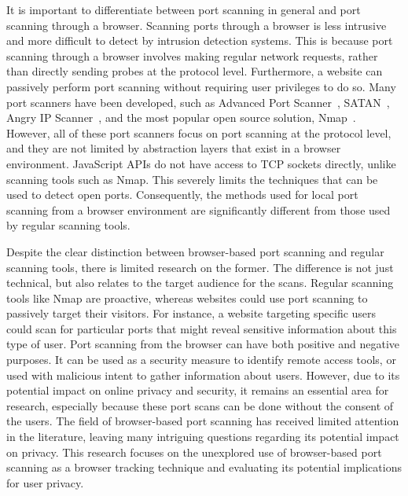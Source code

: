 It is important to differentiate between port scanning in general and port scanning through a browser. 
Scanning ports through a browser is less intrusive and more difficult to detect by intrusion detection systems. This is because port scanning through a browser involves making regular network requests, rather than directly sending probes at the protocol level. Furthermore, a website can passively perform port scanning without requiring user privileges to do so.
Many port scanners have been developed, such as Advanced Port Scanner~, SATAN~, Angry IP Scanner~, and the most popular open source solution, Nmap~. However, all of these port scanners focus on port scanning at the protocol level, and they are not limited by abstraction layers that exist in a browser environment. JavaScript APIs do not have access to TCP sockets directly, unlike scanning tools such as Nmap. This severely limits the techniques that can be used to detect open ports. Consequently, the methods used for local port scanning from a browser environment are significantly different from those used by regular scanning tools.

Despite the clear distinction between browser-based port scanning and regular scanning tools, there is limited research on the former. The difference is not just technical, but also relates to the target audience for the scans. Regular scanning tools like Nmap are proactive, whereas websites could use port scanning to passively target their visitors. For instance, a website targeting specific users could scan for particular ports that might reveal sensitive information about this type of user.
Port scanning from the browser can have both positive and negative purposes. It can be used as a security measure to identify remote access tools, or used with malicious intent to gather information about users. However, due to its potential impact on online privacy and security, it remains an essential area for research, especially because these port scans can be done without the consent of the users.
The field of browser-based port scanning has received limited attention in the literature, leaving many intriguing questions regarding its potential impact on privacy. This research focuses on the unexplored use of browser-based port scanning as a browser tracking technique and evaluating its potential implications for user privacy. 

